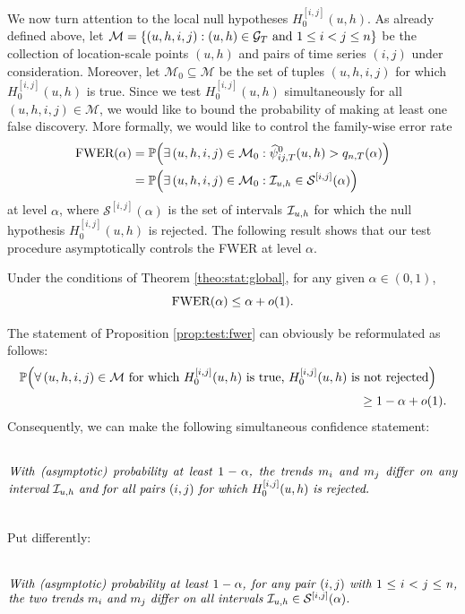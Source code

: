 \documentclass[12pt]{article}
\begin{document}
We now turn attention to the local null hypotheses $H_0^{[i, j]}(u, h)$. As already defined above, let $\mathcal{M} = \{ (u,h,i,j): (u,h) \in \mathcal{G}_T \text{ and } 1 \le i < j \le n \}$ be the collection of location-scale points $(u,h)$ and pairs of time series $(i,j)$ under consideration. Moreover, let $\mathcal{M}_0 \subseteq \mathcal{M}$ be the set of tuples $(u,h,i,j)$ for which $H_0^{[i, j]}(u, h)$ is true. Since we test $H_0^{[i, j]}(u, h)$ simultaneously for all $(u,h,i,j) \in \mathcal{M}$, we would like to bound the probability of making at least one false discovery. More formally, we would like to control the family-wise error rate 
\begin{align*} 
\text{FWER}(\alpha) 
 & = \mathbb{P} \Big(\exists \,  (u,h,i,j) \in \mathcal{M}_0: \widehat{\psi}^0_{ij, T}(u, h) > q_{n,T}(\alpha) \Big) \\
 & = \mathbb{P} \Big(\exists \,  (u,h,i,j) \in \mathcal{M}_0: \mathcal{I}_{u, h} \in \mathcal{S}^{[i, j]}(\alpha) \Big)
\end{align*}
at level $\alpha$, where $\mathcal{S}^{[i, j]}(\alpha)$ is the set of intervals $\mathcal{I}_{u, h}$ for which the null hypothesis $H_0^{[i, j]}(u, h)$ is rejected. The following result shows that our test procedure asymptotically controls the FWER at level $\alpha$.
\begin{prop}\label{prop:test:fwer}
Under the conditions of Theorem \ref{theo:stat:global}, for any given $\alpha \in (0,1)$, 
\[ \textnormal{FWER}(\alpha) \leq \alpha + o(1). \]
\end{prop}
The statement of Proposition \ref{prop:test:fwer} can obviously be reformulated as follows: 
\begin{align*}
\mathbb{P}\Big( \forall \, (u,h,i,j) \in \mathcal{M} \text{ for which } H_0^{[i, j]}(u, h) \text{ is true, } H_0^{[i, j]}(u, h) & \text{ is not rejected} \Big) \\ & \quad \ge 1 - \alpha + o(1).
\end{align*}
Consequently, we can make the following simultaneous confidence statement: 
\begin{equation}\label{eq:CS-v1}
\begin{minipage}[c][2.25cm][c]{13cm}
\textit{With (asymptotic) probability at least $1-\alpha$, the trends $m_i$ and $m_j$ differ on any interval $\interval$ and for all pairs $(i,j)$ for which $H_0^{[i, j]}(u, h)$ is rejected.}
\end{minipage}
\end{equation}
Put differently:
\begin{equation}\label{eq:CS-v2}
\begin{minipage}[c][2.25cm][c]{13cm}
\textit{With (asymptotic) probability at least $1-\alpha$, for any pair $(i,j)$ with $1 \le i < j \le n$, the two trends $m_i$ and $m_j$ differ on all intervals $\interval \in \mathcal{S}^{[i, j]}(\alpha)$.}
\end{minipage}
\end{equation}
\end{document}
